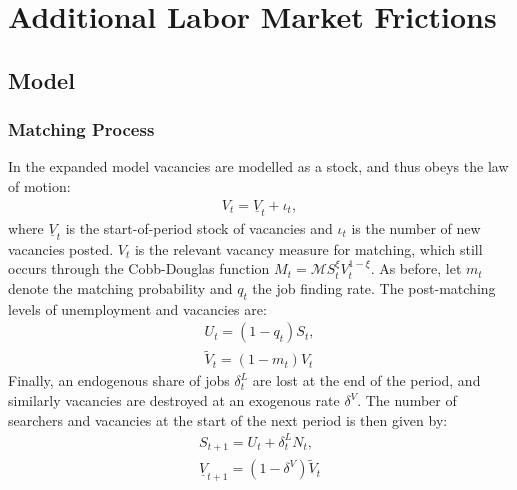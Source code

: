 


\pagebreak 
\section{Additional Labor Market Frictions}

\citet{Jeppe2020}



\subsection{Model}
\subsubsection{Matching Process}
In the expanded model vacancies are modelled as a stock, and thus obeys the law of motion:
\begin{gather*}
V_{t}=\underline{V}_{t}+\iota_{t}, 
\end{gather*}
where $\underline{V}_{t}$ is the start-of-period stock of vacancies and $\iota_{t}$ is the number of new vacancies posted. $V_t$ is the relevant vacancy measure for matching, which still occurs through the Cobb-Douglas function $M_{t} = \mathcal{M} S_{t}^{\xi}V_{t}^{1-\xi}$. As before, let $m_t$ denote the matching probability and $q_t$ the job finding rate. The post-matching levels of unemployment and vacancies are:
\begin{gather*}
U_{t}=\left(1-q_{t}\right)S_{t}, \\
\tilde{V}_{t}=\left(1-m_{t}\right)V_{t}
\end{gather*}
Finally, an endogenous share of jobs $\delta^L_t$ are lost at the end of the period, and similarly vacancies are destroyed at an exogenous rate $\delta^V$. The number of searchers and vacancies at the start of the next period is then given by:
\begin{gather*}
S_{t+1}=U_{t}+\delta_{t}^{L}N_{t}, \\
\underline{V}_{t+1}=\left(1-\delta^{V}\right)\tilde{V}_{t}
\end{gather*}
 

